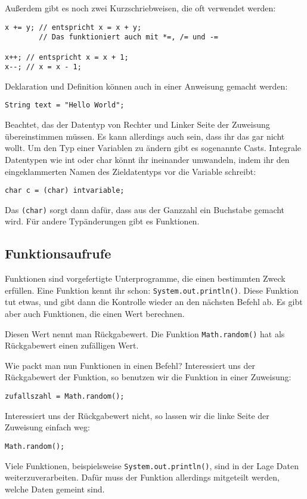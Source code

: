 Außerdem gibt es noch zwei Kurzschriebweisen, die oft verwendet werden:
\begin{lstlisting}
x += y; // entspricht x = x + y;
        // Das funktioniert auch mit *=, /= und -=

x++; // entspricht x = x + 1;
x--; // x = x - 1;
\end{lstlisting}
Deklaration und Definition können auch in einer Anweisung gemacht werden: 
\begin{lstlisting}
String text = "Hello World";
\end{lstlisting}
Beachtet, das der Datentyp von Rechter und Linker Seite der Zuweisung übereinstimmen müssen. Es kann allerdings auch sein, dass ihr das gar nicht wollt.
Um den Typ einer Variablen zu ändern gibt es sogenannte Casts. Integrale Datentypen wie int oder char könnt ihr ineinander umwandeln, indem ihr den eingeklammerten Namen des Zieldatentyps vor die Variable schreibt: 
\begin{lstlisting}
char c = (char) intvariable;
\end{lstlisting}
Das \lstinline$(char)$ sorgt dann dafür, dass aus der Ganzzahl ein Buchstabe gemacht wird.
Für andere Typänderungen gibt es Funktionen.

\subsection{Funktionsaufrufe}
Funktionen sind vorgefertigte Unterprogramme, die einen bestimmten Zweck erfüllen. Eine Funktion kennt ihr schon: \lstinline$System.out.println()$.
Diese Funktion tut etwas, und gibt dann die Kontrolle wieder an den nächsten Befehl ab. Es gibt aber auch Funktionen, die einen Wert berechnen.

Diesen Wert nennt man Rückgabewert. Die Funktion \lstinline$Math.random()$ hat als Rückgabewert einen zufälligen Wert.

Wie packt man nun Funktionen in einen Befehl? Interessiert uns der Rückgabewert der Funktion, so benutzen wir die Funktion in einer Zuweisung: 
\begin{lstlisting}
zufallszahl = Math.random();
\end{lstlisting}
Interessiert uns der Rückgabewert nicht, so lassen wir die linke Seite der Zuweisung einfach weg:
\begin{lstlisting}
Math.random();
\end{lstlisting}
Viele Funktionen, beispielsweise \lstinline$System.out.println()$, sind in der Lage Daten weiterzuverarbeiten. Dafür muss der Funktion allerdings mitgeteilt werden, welche Daten gemeint sind.

